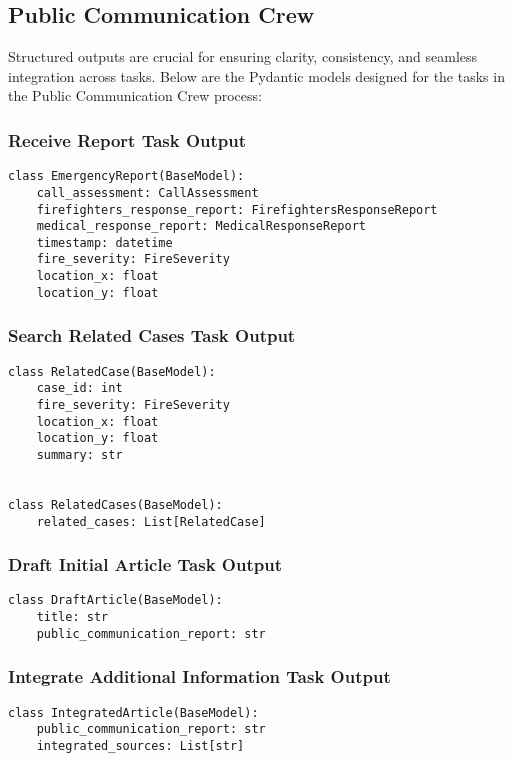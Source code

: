 \subsection{Public Communication Crew}

Structured outputs are crucial for ensuring clarity, consistency, and seamless integration across tasks. Below are the Pydantic models designed for the tasks in the Public Communication Crew process:

\subsubsection{Receive Report Task Output}
\begin{lstlisting}[caption={Pydantic model for Receive Report Task Output}]
class EmergencyReport(BaseModel):
    call_assessment: CallAssessment
    firefighters_response_report: FirefightersResponseReport
    medical_response_report: MedicalResponseReport
    timestamp: datetime
    fire_severity: FireSeverity
    location_x: float
    location_y: float
\end{lstlisting}

\subsubsection{Search Related Cases Task Output}
\begin{lstlisting}[caption={Pydantic model for Search Related Cases Task Output}]
class RelatedCase(BaseModel):
    case_id: int
    fire_severity: FireSeverity
    location_x: float
    location_y: float
    summary: str


class RelatedCases(BaseModel):
    related_cases: List[RelatedCase]
\end{lstlisting}

\subsubsection{Draft Initial Article Task Output}
\begin{lstlisting}[caption={Pydantic model for Draft Initial Article Task Output}]
class DraftArticle(BaseModel):
    title: str
    public_communication_report: str
\end{lstlisting}

\subsubsection{Integrate Additional Information Task Output}
\begin{lstlisting}[caption={Pydantic model for Integrate Additional Information Task Output}]
class IntegratedArticle(BaseModel):
    public_communication_report: str
    integrated_sources: List[str]
\end{lstlisting}

